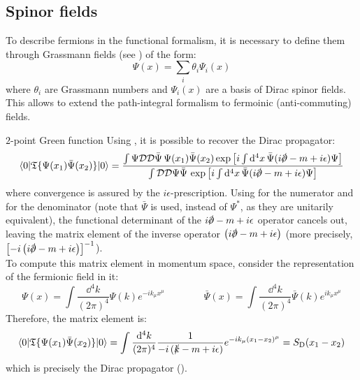 \subsection{Spinor fields}

To describe fermions in the functional formalism, it is necessary to define them through Grassmann fields (see ) of the form:
\begin{equation*}
  \Psi(x) = \sum_i \theta_i \Psi_i(x)
\end{equation*}
where $ \theta_i $ are Grassmann numbers and $ \Psi_i(x) $ are a basis of Dirac spinor fields. This allows to extend the path-integral formalism to fermoinic (anti-commuting) fields.

\begin{example}{$ 2 $-point Green function}{}
  Using , it is possible to recover the Dirac propagator:
  \begin{equation*}
    \braket{0 | \tempord\{\Psi(x_1) \bar{\Psi}(x_2)\} | 0} = \frac{\int \Psi \mathcal{D} \mathcal{D} \bar{\Psi}\, \Psi(x_1) \bar{\Psi}(x_2) \exp \left[ i \int \dd^4x\, \bar{\Psi} ( i \slashed{\pa} - m + i\epsilon ) \Psi \right]}{\int \mathcal{D} \mathcal{D} \Psi \bar{\Psi}\, \exp \left[ i \int \dd^4x\, \bar{\Psi} ( i \slashed{\pa} - m + i\epsilon ) \Psi \right]}
  \end{equation*}
  where convergence is assured by the $ i\epsilon $-prescription. Using  for the numerator and  for the denominator (note that $ \bar{\Psi} $ is used, instead of $ \Psi^* $, as they are unitarily equivalent), the functional determinant of the $ i \slashed{\pa} - m + i\epsilon $ operator cancels out, leaving the matrix element of the inverse operator $ \left( i \slashed{\pa} - m + i\epsilon \right) $ (more precisely, $ \left[ -i \left( i \slashed{\pa} - m + i\epsilon \right) \right]^{-1} $). \\
  To compute this matrix element in momentum space, consider the representation of the fermionic field in it:
  \begin{equation}
    \Psi(x) = \int \frac{\dd^4k}{(2\pi)^4} \Psi(k) e^{-i k_\mu x^\mu}
    \qquad \qquad
    \bar{\Psi}(x) = \int \frac{\dd^4k}{(2\pi)^4} \bar{\Psi}(k) e^{i k_\mu x^\mu}
  \end{equation}
  Therefore, the matrix element is:
  \begin{equation*}
    \braket{0 | \mathfrak{T}\{\Psi(x_1) \bar{\Psi}(x_2)\} | 0} = \int \frac{\mathrm{d}^4k}{(2\pi)^4} \frac{1}{-i \left( \slashed{k} -m + i\epsilon \right)} e^{-i k_\mu (x_1 - x_2)^\mu} = S_\text{D}(x_1 - x_2)
  \end{equation*}
  which is precisely the Dirac propagator ().
\end{example}

